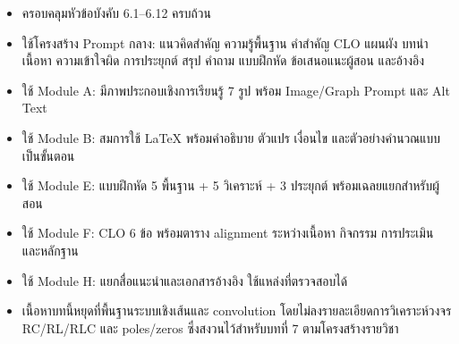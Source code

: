 \begin{itemize}
    \item ครอบคลุมหัวข้อบังคับ 6.1–6.12 ครบถ้วน
    \item ใช้โครงสร้าง Prompt กลาง: แนวคิดสำคัญ ความรู้พื้นฐาน คำสำคัญ CLO แผนผัง บทนำ เนื้อหา ความเข้าใจผิด การประยุกต์ สรุป คำถาม แบบฝึกหัด ข้อเสนอแนะผู้สอน และอ้างอิง
    \item ใช้ Module A: มีภาพประกอบเชิงการเรียนรู้ 7 รูป พร้อม Image/Graph Prompt และ Alt Text
    \item ใช้ Module B: สมการใช้ LaTeX พร้อมคำอธิบาย ตัวแปร เงื่อนไข และตัวอย่างคำนวณแบบเป็นขั้นตอน
    \item ใช้ Module E: แบบฝึกหัด 5 พื้นฐาน + 5 วิเคราะห์ + 3 ประยุกต์ พร้อมเฉลยแยกสำหรับผู้สอน
    \item ใช้ Module F: CLO 6 ข้อ พร้อมตาราง alignment ระหว่างเนื้อหา กิจกรรม การประเมิน และหลักฐาน
    \item ใช้ Module H: แยกสื่อแนะนำและเอกสารอ้างอิง ใช้แหล่งที่ตรวจสอบได้
    \item เนื้อหาบทนี้หยุดที่พื้นฐานระบบเชิงเส้นและ convolution โดยไม่ลงรายละเอียดการวิเคราะห์วงจร RC/RL/RLC และ poles/zeros ซึ่งสงวนไว้สำหรับบทที่ 7 ตามโครงสร้างรายวิชา
\end{itemize}

